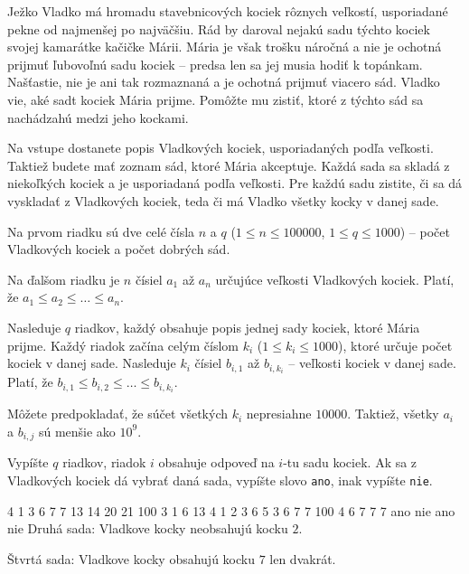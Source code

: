 




Ježko Vladko má hromadu stavebnicových kociek rôznych veľkostí, usporiadané pekne od najmenšej po
najväčšiu. Rád by daroval nejakú sadu týchto kociek svojej kamarátke kačičke Márii. Mária je však
trošku náročná a nie je ochotná prijmuť ľubovoľnú sadu kociek -- predsa len sa jej musia hodiť k
topánkam. Našťastie, nie je ani tak rozmaznaná a je ochotná prijmuť viacero sád. Vladko vie, aké
sadt kociek Mária prijme. Pomôžte mu zistiť, ktoré z týchto sád sa nachádzahú medzi jeho kockami.


Na vstupe dostanete popis Vladkových kociek, usporiadaných podľa veľkosti. Taktiež budete mať zoznam
sád, ktoré Mária akceptuje. Každá sada sa skladá z niekoľkých kociek a je usporiadaná podľa veľkosti.
Pre každú sadu zistite, či sa dá vyskladať z Vladkových kociek, teda či má Vladko všetky kocky v
danej sade.


Na prvom riadku sú dve celé čísla $n$ a $q$ ($1 \leq n \leq 100000$, $1 \leq q \leq 1000$) -- počet
Vladkových kociek a počet dobrých sád.

Na ďalšom riadku je $n$ čísiel $a_1$ až $a_n$ určujúce veľkosti Vladkových kociek. Platí, že $a_1
\leq a_2 \leq \dots \leq a_n$.

Nasleduje $q$ riadkov, každý obsahuje popis jednej sady kociek, ktoré Mária prijme. Každý riadok
začína celým číslom $k_i$ ($1 \leq k_i \leq 1000$), ktoré určuje počet kociek v danej sade. Nasleduje $k_i$ čísiel
$b_{i,1}$  až $b_{i, k_i}$ -- veľkosti kociek v danej sade. Platí, že $b_{i,1} \leq b_{i,2} \leq \dots
\leq b_{i,k_i}$.

Môžete predpokladať, že súčet všetkých $k_i$ nepresiahne $10000$. Taktiež, všetky $a_i$ a $b_{i,j}$
sú menšie ako $10^9$.


Vypíšte $q$ riadkov, riadok $i$ obsahuje odpoveď na $i$-tu sadu kociek. Ak sa z Vladkových kociek dá
vybrať daná sada, vypíšte slovo \texttt{ano}, inak vypíšte \texttt{nie}.


 4
1 3 6 7 7 13 14 20 21 100
3 1 6 13
4 1 2 3 6
5 3 6 7 7 100
4 6 7 7 7
\vystup
ano
nie
ano
nie
\komentar
Druhá sada: Vladkove kocky neobsahujú kocku $2$.

Štvrtá sada: Vladkove kocky obsahujú kocku $7$ len dvakrát.
\koniec


